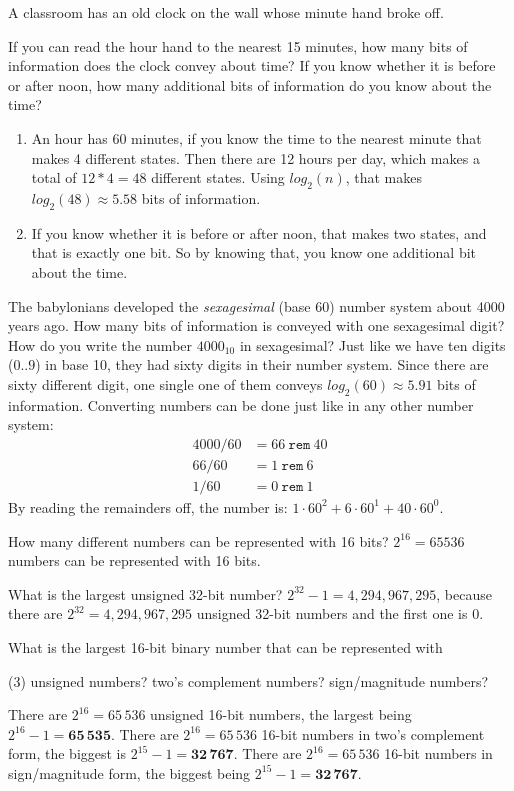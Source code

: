 \exercise
A classroom has an old clock on the wall whose minute hand broke off.
\begin{tasks}
	\task If you can read the hour hand to the nearest 15 minutes, how many
	bits of information does the clock convey about time?
	\task If you know whether it is before or after noon, how many additional
	bits of information do you know about the time?	
\end{tasks}
\solution
\begin{enumerate}[label=\alph*)]
	\item An hour has 60 minutes, if you know the time to the nearest
	minute that makes 4 different states. Then there are 12 hours per day,
	which makes a total of $12*4=48$ different states. Using $log_2(n)$,
	that makes $log_2(48) \approx 5.58$ bits of information.
	\item If you know whether it is before or after noon, that makes two
	states, and that is exactly one bit. So by knowing that, you know
	one additional bit about the time.
\end{enumerate}

\exercise
The babylonians developed the \emph{sexagesimal} (base 60) number system
about 4000 years ago. How many bits of information is conveyed with one
sexagesimal digit? How do you write the number $4000_{10}$ in sexagesimal?
\solution
Just like we have ten digits ($0..9$) in base 10, they had sixty digits in
their number system. Since there are sixty different digit, one single one
of them conveys $log_2(60) \approx \mathbf{5.91}$ bits of information. 
Converting numbers can be done just like in any other number system:
\begin{align*}
4000 / 60 & = 66 \: \mathtt{rem} \: 40 \\
66 / 60 & = 1 \: \mathtt{rem} \: 6 \\
1 / 60 & = 0 \: \mathtt{rem} \: 1	
\end{align*}
By reading the remainders off, the number is: $1 \cdot 60^2+6 \cdot 60^1+40
\cdot 60^0$.

\exercise
How many different numbers can be represented with 16 bits?
\solution
$2^{16}=65536$ numbers can be represented with 16 bits.

\exercise
What is the largest unsigned 32-bit number?
\solution
$2^{32}-1=4,294,967,295$, because there are $2^{32}=4,294,967,295$ unsigned
32-bit numbers and the first one is $0$.

\exercise
What is the largest 16-bit binary number that can be represented with 
\begin{tasks}(3)
	\task unsigned numbers?
	\task two's complement numbers?
	\task sign/magnitude numbers?
\end{tasks}
\solution
\begin{tasks}
	\task There are $2^{16}=65\,536$ unsigned 16-bit numbers, the 
	largest being $2^{16}-1=\mathbf{65\,535}$.
	\task There are $2^{16}=65\,536$ 16-bit numbers in two's complement form,
	the biggest is $2^{15}-1=\mathbf{32\,767}$.
	\task There are $2^{16}=65\,536$ 16-bit numbers in sign/magnitude form,
	the biggest being
	$2^{15}-1=\mathbf{32\,767}$.
\end{tasks}

